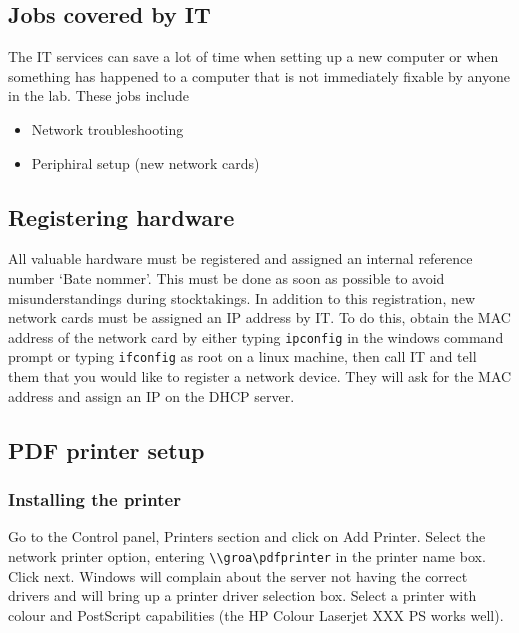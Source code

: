 \subsection{Jobs covered by IT}
The IT services can save a lot of time when setting up a new computer or when something has happened to a computer that is not immediately fixable by anyone in the lab.  These jobs include
\begin{itemize}
	\item Network troubleshooting
	\item Periphiral setup (new network cards)
\end{itemize}

\subsection{Registering hardware}
All valuable hardware must be registered and assigned an internal reference number `Bate nommer'.  This must be done as soon as possible to avoid misunderstandings during stocktakings.  In addition to this registration, new network cards must be assigned an IP address by IT.  To do this, obtain the MAC address of the network card by either typing \verb|ipconfig| in the windows command prompt or typing \verb|ifconfig| as root on a linux machine, then call IT and tell them that you would like to register a network device.  They will ask for the MAC address and assign an IP on the DHCP server.

\subsection{PDF printer setup}

\subsubsection{Installing the printer}
Go to the Control panel, Printers section and click on Add Printer.  Select the network printer option, entering \verb|\\groa\pdfprinter| in the printer name box.  Click next.  Windows will complain about the server not having the correct drivers and will bring up a printer driver selection box.  Select a printer with colour and PostScript capabilities (the HP Colour Laserjet XXX PS works well).

